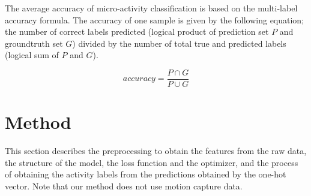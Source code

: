 \documentclass{svmult}
\begin{document}
The average accuracy of micro-activity classification is based on the multi-label accuracy formula. The accuracy of one sample is given by the following equation; the number of correct labels predicted (logical product of prediction set $P$ and groundtruth set $G$) divided by the number of total true and predicted labels (logical sum of $P$ and $G$).

\begin{equation}\label{eqn:accuracy}
    accuracy = \frac{P\cap G}{P\cup G}
\end{equation}

\section{Method}
\label{sec:method}
This section describes the preprocessing to obtain the features from the raw data, the structure of the model, the loss function and the optimizer, and the process of obtaining the activity labels from the predictions obtained by the one-hot vector. Note that our method does not use motion capture data.


\end{document}
